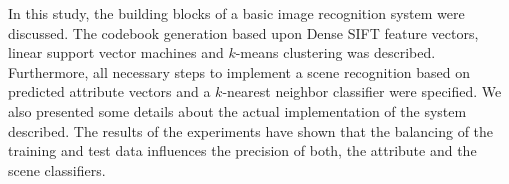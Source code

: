 \documentclass{vldb}
\begin{document}
In this study, the building blocks of a basic image recognition system were
discussed. The codebook generation based upon Dense SIFT feature vectors, linear
support vector machines and $k$-means clustering was described. Furthermore, all
necessary steps to implement a scene recognition based on predicted attribute
vectors and a $k$-nearest neighbor classifier were specified. We also presented
some details about the actual implementation of the system described. The results
of the experiments have shown that the balancing of the training and test data
influences the precision of both, the attribute and the scene classifiers.




\end{document}
